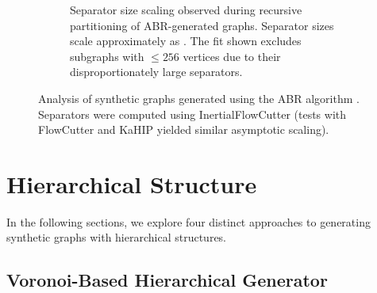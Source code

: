 \begin{figure}[tbhp]
\begin{subfigure}[t]{0.55\linewidth}
		\caption{Separator size scaling observed during recursive partitioning of ABR-generated graphs. Separator sizes scale approximately as . The fit shown excludes subgraphs with \( \le 256 \) vertices due to their disproportionately large separators.}
		\label{fig:abr_graph_sep_plot}
	\end{subfigure}
	\caption{Analysis of synthetic graphs generated using the ABR algorithm \cite{abraham_highway_2010}. Separators were computed using InertialFlowCutter (tests with FlowCutter and KaHIP yielded similar asymptotic scaling).}
	\label{fig:abr_graph_separators}
\end{figure}

\section{Hierarchical Structure}

In the following sections, we explore four distinct approaches to generating synthetic graphs with hierarchical structures.

\subsection{Voronoi-Based Hierarchical Generator}

